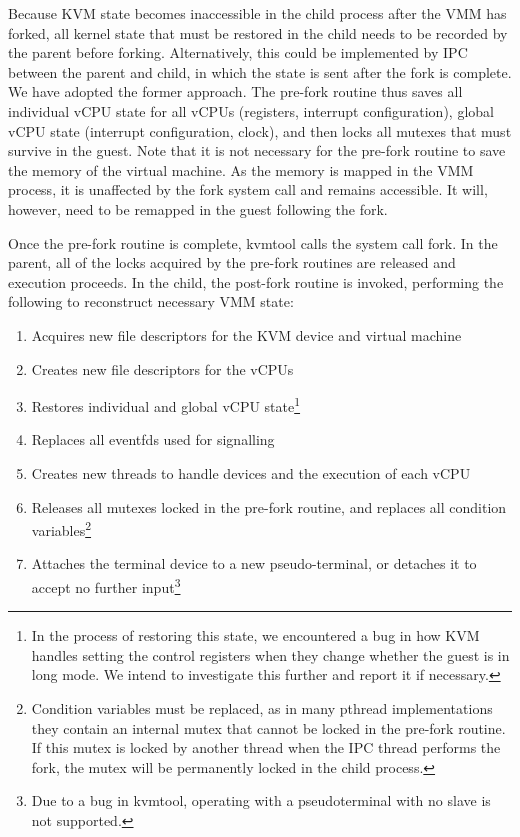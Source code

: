 Because KVM state becomes inaccessible in the child process after the VMM has
forked, all kernel state that must be restored in the child needs to be
recorded by the parent before forking. Alternatively, this could be implemented
by IPC between the parent and child, in which the state is sent after the fork
is complete. We have adopted the former approach. The pre-fork routine thus
saves all individual vCPU state for all vCPUs (registers, interrupt
configuration), global vCPU state (interrupt configuration, clock), and then
locks all mutexes that must survive in the guest. Note that it is not necessary
for the pre-fork routine to save the memory of the virtual machine. As the
memory is mapped in the VMM process, it is unaffected by the fork system call
and remains accessible. It will, however, need to be remapped in the guest
following the fork.

Once the pre-fork routine is complete, kvmtool calls the system call fork. In
the parent, all of the locks acquired by the pre-fork routines are released and
execution proceeds. In the child, the post-fork routine is invoked, performing
the following to reconstruct necessary VMM state:

\begin{enumerate}
\item Acquires new file descriptors for the KVM device and virtual machine
\item Creates new file descriptors for the vCPUs
\item Restores individual and global vCPU state\footnote{In the process of
restoring this state, we encountered a bug in how KVM handles setting the
control registers when they change whether the guest is in long mode. We intend
to investigate this further and report it if necessary.}
\item Replaces all eventfds used for signalling
\item Creates new threads to handle devices and the execution of each vCPU
\item Releases all mutexes locked in the pre-fork routine, and replaces all
condition variables\footnote{Condition variables must be replaced, as in many
pthread implementations they contain an internal mutex that cannot be locked in
the pre-fork routine. If this mutex is locked by another thread when the IPC
thread performs the fork, the mutex will be permanently locked in the child
process.}
\item Attaches the terminal device to a new pseudo-terminal, or detaches it to
accept no further input\footnote{Due to a bug in kvmtool, operating with a
pseudoterminal with no slave is not supported.}
\end{enumerate}

